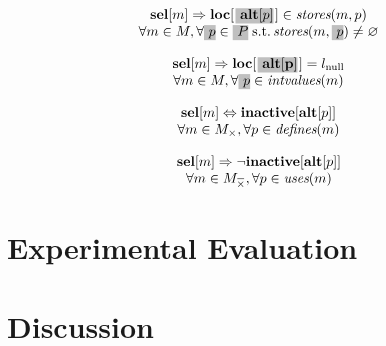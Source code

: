 \begin{equation}
  \begin{array}{c}
    \mVar{sel}[m]
    \mImp
    \mVar{loc}[\hlDiff{\mVar{alt}[p]}[1pt]] \in \mStores(m, p) \\
    \forall m \in \mMatchSet,
    \forall \hlDiff{p} \in
      \hlDiff{\mOperandSet} \;\text{s.t.}
      \mStores(m, \hlDiff{p}) \neq \mEmptySet
  \end{array}
  \labelEquation{valid-locations-alt}
\end{equation}

\begin{equation}
  \begin{array}{c}
    \mVar{sel}[m]
    \mImp
    \mVar{loc}[\hlDiff{\mVar{alt[p]}}[1pt]] = \mNullLocation \\
    \forall m \in \mMatchSet,
    \forall \hlDiff{p} \in \mIntValues(m)
  \end{array}
  \labelEquation{locs-of-intermediate-values-alt}
\end{equation}

\begin{equation}
  \begin{array}{c}
    \mVar{sel}[m]
    \mEq
    \mVar{inactive}[\mVar{alt}[p]] \\
    \forall m \in \mMatchSet[\mKill],
    \forall p \in \mDefines(m)
  \end{array}
  \labelEquation{inactivity-when-killed}
\end{equation}

\begin{equation}
  \begin{array}{c}
    \mVar{sel}[m]
    \mImp
    \neg \mVar{inactive}[\mVar{alt}[p]] \\
    \forall m \in \mMatchCompSet{\mKill},
    \forall p \in \mUses(m)
  \end{array}
  \labelEquation{inactivity-when-used}
\end{equation}

\section{Experimental Evaluation}

\section{Discussion}
